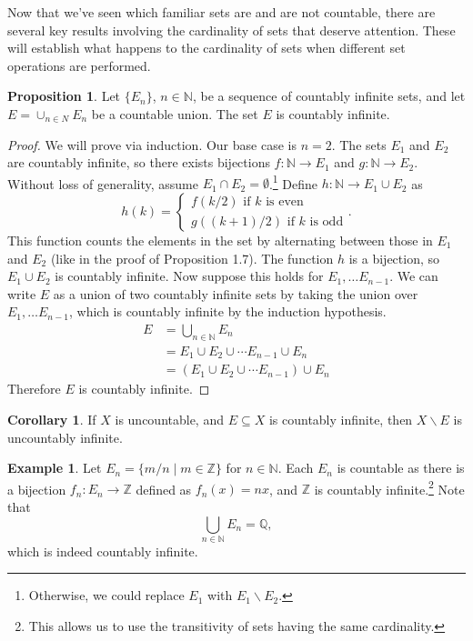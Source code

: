 \documentclass{article}
\newcommand{\N}{\mathbb{N}}
\newcommand{\Q}{\mathbb{Q}}
\newcommand{\Z}{\mathbb{Z}}
\theoremstyle{definition}
\newtheorem{proposition}{Proposition}[section]
\newtheorem{corollary}{Corollary}[section]
\newtheorem{example}{Example}[section]
\begin{document}
	Now that we've seen which familiar sets are and are not countable, there are several key results involving the cardinality of sets that deserve attention. These will establish what happens to the cardinality of sets when different set operations are performed. 
	\begin{proposition}
		Let $ \{E_n\} $, $ n\in\N $, be a sequence of countably infinite sets, and let $ E=\cup_{n\in N}E_n $ be a countable union. The set $ E $ is countably infinite. 
	\end{proposition}
	\begin{proof}
		We will prove via induction. Our base case is $ n=2 $. The sets $ E_1 $ and $ E_2 $ are countably infinite, so there exists bijections $ f:\N\to E_1 $ and $ g:\N\to E_2 $. Without loss of generality, assume $ E_1\cap E_2=\emptyset $.\footnote{Otherwise, we could replace $ E_1 $ with $ E_1\backslash E_2 $.} Define $ h:\N\to E_1\cup E_2 $ as $$ h(k)=\begin{cases}
			f(k/2)\text{ if }k  \text{ is even}\\
			g((k+1)/2)\text{ if }k  \text{ is odd}
		\end{cases}. $$ This function counts the elements in the set by alternating between those in $ E_1 $ and $ E_2 $ (like in the proof of Proposition 1.7). The function $ h $ is a bijection, so $ E_1\cup E_2 $ is countably infinite. Now suppose this holds for $ E_1,\ldots E_{n-1} $. We can write $ E $ as a union of two countably infinite sets by taking the union over $ E_1,\ldots E_{n-1} $, which is countably infinite by the induction hypothesis. 
		\begin{align*}
			E&=\bigcup_{n\in \N} E_n\\
			&=E_1\cup E_2\cup\cdots E_{n-1}\cup E_n\\
			&=(E_1\cup E_2\cup\cdots E_{n-1})\cup E_n
		\end{align*} 
		Therefore $ E $ is countably infinite. 
	\end{proof}
	\begin{corollary}
		If $ X $ is uncountable, and $ E\subseteq X $ is countably infinite, then $ X\backslash E$ is uncountably infinite.
	\end{corollary}
	\begin{example}
		Let $ E_n=\{m/n\mid m\in\Z\} $ for $ n\in\N $. Each $ E_n $ is countable as there is a bijection $ f_n:E_n\to\Z $ defined as $ f_n(x)=nx $, and $ \Z $ is countably infinite.\footnote{This allows us to use the transitivity of sets having the same cardinality.} Note that $$\bigcup_{n\in \N}E_n=\Q, $$ which is indeed countably infinite. 
	\end{example}
\end{document}
